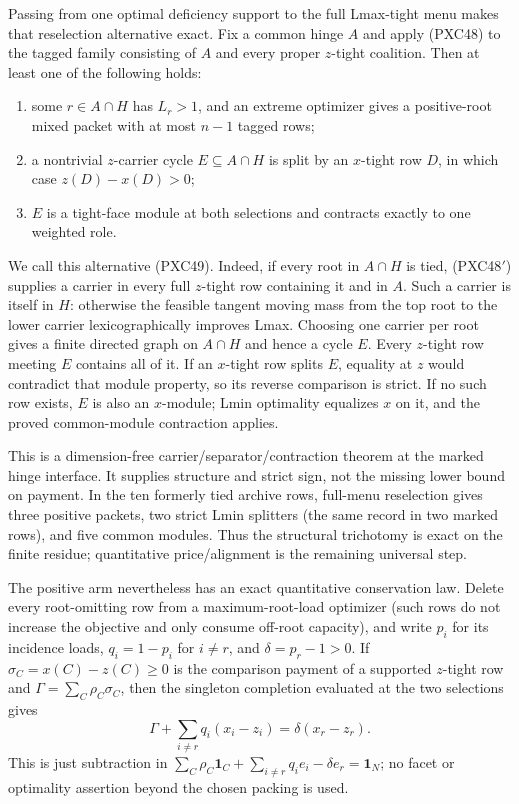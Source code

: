 \documentclass[11pt]{article}
\newcommand{\one}{\mathbf 1}
\begin{document}
Passing from one optimal deficiency support to the full Lmax-tight menu makes
that reselection alternative exact.  Fix a common hinge $A$ and apply
(PXC48) to the tagged family consisting of $A$ and every proper $z$-tight
coalition.  Then at least one of the following holds:
\begin{enumerate}[label=(\alph*)]
\item some $r\in A\cap H$ has $L_r>1$, and an extreme optimizer gives a
      positive-root mixed packet with at most $n-1$ tagged rows;
\item a nontrivial $z$-carrier cycle $E\subseteq A\cap H$ is split by an
      $x$-tight row $D$, in which case
      $z(D)-x(D)>0$;
\item $E$ is a tight-face module at both selections and contracts exactly to
      one weighted role.
\end{enumerate}
We call this alternative (PXC49).
Indeed, if every root in $A\cap H$ is tied, (PXC48$'$) supplies a carrier in
every full $z$-tight row containing it and in $A$.  Such a carrier is itself
in $H$: otherwise the feasible tangent moving mass from the top root to the
lower carrier lexicographically improves Lmax.  Choosing one carrier per
root gives a finite directed graph on $A\cap H$ and hence a cycle $E$.
Every $z$-tight row meeting $E$ contains all of it.  If an $x$-tight row
splits $E$, equality at $z$ would contradict that module property, so its
reverse comparison is strict.  If no such row exists, $E$ is also an
$x$-module; Lmin optimality equalizes $x$ on it, and the proved common-module
contraction applies.

This is a dimension-free carrier/separator/contraction theorem at the marked
hinge interface.  It supplies structure and strict sign, not the missing
lower bound on payment.  In the ten formerly tied archive rows, full-menu
reselection gives three positive packets, two strict Lmin splitters (the same
record in two marked rows), and five common modules.  Thus the structural
trichotomy is exact on the finite residue; quantitative price/alignment is
the remaining universal step.

The positive arm nevertheless has an exact quantitative conservation law.
Delete every root-omitting row from a maximum-root-load optimizer (such rows
do not increase the objective and only consume off-root capacity), and write
$p_i$ for its incidence loads,
$q_i=1-p_i$ for $i\ne r$, and $\delta=p_r-1>0$.  If
$\sigma_C=x(C)-z(C)\ge0$ is the comparison payment of a supported
$z$-tight row and
$\Gamma=\sum_C\rho_C\sigma_C$, then the singleton completion evaluated at
the two selections gives
\[
 \Gamma+\sum_{i\ne r}q_i(x_i-z_i)
   =\delta(x_r-z_r).                                \tag{PXC50}
\]
This is just subtraction in
$\sum_C\rho_C\one_C+\sum_{i\ne r}q_i e_i-\delta e_r=\one_N$;
no facet or optimality assertion beyond the chosen packing is used.
\end{document}
